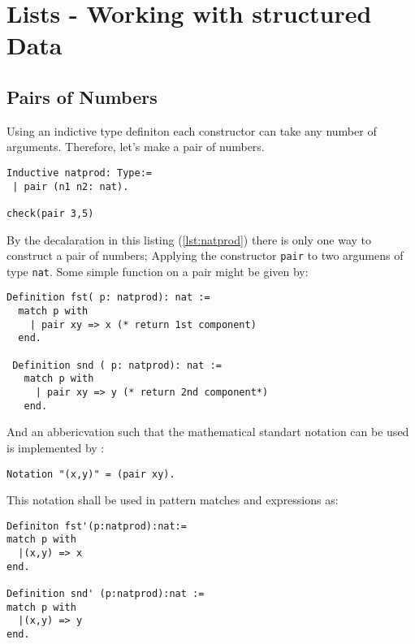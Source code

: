 \section{Lists - Working with structured Data}

\subsection{Pairs of Numbers}

Using an indictive type definiton each constructor can take any number of arguments. 
Therefore, let's make a pair of numbers.

\begin{lstlisting}[caption = \lstinline!natprod!, label = lst:natprod]
Inductive natprod: Type:=
 | pair (n1 n2: nat).

check(pair 3,5)
\end{lstlisting}
By the decalaration in this listing (\ref{lst:natprod}) there is only one way to construct a pair of numbers; 
Applying the constructor \lstinline!pair! to two argumens of type \lstinline!nat!.
Some simple function on a pair might be given by: 
\begin{lstlisting}[caption = \lstinline!fst!, label = lst:fst]
Definition fst( p: natprod): nat :=
  match p with 
    | pair xy => x (* return 1st component)
  end.
 
 Definition snd ( p: natprod): nat :=
   match p with 
     | pair xy => y (* return 2nd component*)
   end.
\end{lstlisting}

And an abbericvation such that the mathematical standart notation can be used is implemented by :
\begin{lstlisting}[caption=\lstinline!pair!-naotation, label = lst:pairNotation]
Notation "(x,y)" = (pair xy).
\end{lstlisting}

This notation shall be used in pattern matches and expressions as: 
\begin{lstlisting}[caption = \lstinline!fst'! and \lstinline!snd'!, label =lst:newNotation ]
Definiton fst'(p:natprod):nat:=
match p with
  |(x,y) => x
end.

Definition snd' (p:natprod):nat :=
match p with
  |(x,y) => y
end.
\end{lstlisting}




